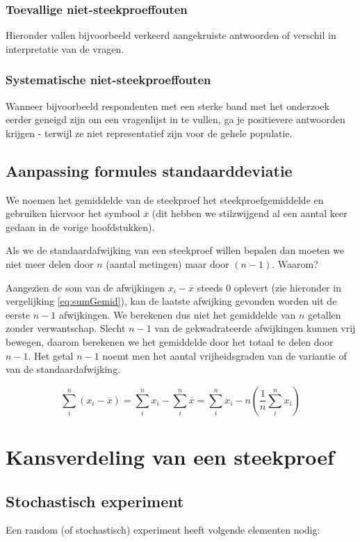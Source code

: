 \subsubsection{Toevallige niet-steekproeffouten}
Hieronder vallen bijvoorbeeld verkeerd aangekruiste antwoorden of verschil in interpretatie van de vragen.

\subsubsection{Systematische niet-steekproeffouten}
Wanneer bijvoorbeeld respondenten met een sterke band met het onderzoek eerder geneigd zijn om een vragenlijst in te vullen, ga je positievere antwoorden krijgen - terwijl ze niet representatief zijn voor de gehele populatie.

\subsection{Aanpassing formules standaarddeviatie}
We noemen het gemiddelde van de steekproef het steekproefgemiddelde en gebruiken hiervoor het symbool $\overline{x}$ (dit hebben we stilzwijgend al een aantal keer gedaan in de vorige hoofdstukken).

Als we de standaardafwijking van een steekproef willen bepalen dan moeten we niet meer delen door $n$ (aantal metingen) maar door $(n-1)$. Waarom?

Aangezien de som van de afwijkingen $x_{i} - \overline{x}$ steeds 0 oplevert (zie hieronder in vergelijking \ref{eq:sumGemid}), kan de laatste afwijking gevonden worden uit de eerste $n-1$ afwijkingen. We berekenen dus niet het gemiddelde van $n$ getallen zonder verwantschap. Slecht $n-1$ van de gekwadrateerde afwijkingen kunnen vrij bewegen, daarom berekenen we het gemiddelde door het totaal te delen door $n-1$. Het getal $n-1$ noemt men het aantal vrijheidsgraden van de variantie of van de standaardafwijking.

\begin{equation}
 \sum_{i}^{n}(x_{i} - \overline{x}) = \sum_{i}^{n}x_{i} - \sum_{i}^{n}\overline{x} = \sum_{i}^{n}x_{i} - n (\frac{1}{n}\sum_{i}^{n} x_{i})
\label{eq:sumGemid}
\end{equation}

\section{Kansverdeling van een steekproef}
\subsection{Stochastisch experiment}
Een random (of stochastisch) experiment heeft volgende elementen nodig:


